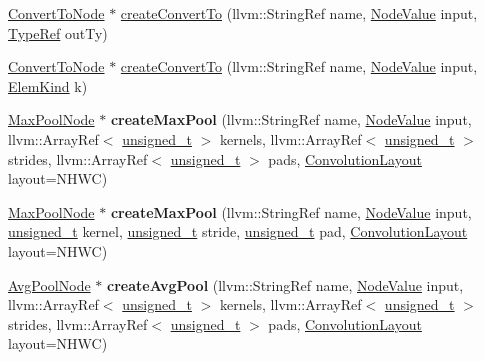 \begin{DoxyCompactItemize}
\item 
\hyperlink{classglow_1_1_convert_to_node}{Convert\+To\+Node} $\ast$ \hyperlink{classglow_1_1_function_afb186d99df71f01dc37871b7a91fe207}{create\+Convert\+To} (llvm\+::\+String\+Ref name, \hyperlink{structglow_1_1_node_value}{Node\+Value} input, \hyperlink{structglow_1_1_type}{Type\+Ref} out\+Ty)
\item 
\hyperlink{classglow_1_1_convert_to_node}{Convert\+To\+Node} $\ast$ \hyperlink{classglow_1_1_function_aad00b9f260eb7c5c21f5c59ebd0089b3}{create\+Convert\+To} (llvm\+::\+String\+Ref name, \hyperlink{structglow_1_1_node_value}{Node\+Value} input, \hyperlink{namespaceglow_ab92e14a94329daf4083db670e95fbcdf}{Elem\+Kind} k)
\item 
\mbox{\label{classglow_1_1_function_a81424770e89904f98f677caf5d494997}} 
\hyperlink{classglow_1_1_max_pool_node}{Max\+Pool\+Node} $\ast$ {\bfseries create\+Max\+Pool} (llvm\+::\+String\+Ref name, \hyperlink{structglow_1_1_node_value}{Node\+Value} input, llvm\+::\+Array\+Ref$<$ \hyperlink{namespaceglow_a0ca574644e1e42ef193a9947fb4d8911}{unsigned\+\_\+t} $>$ kernels, llvm\+::\+Array\+Ref$<$ \hyperlink{namespaceglow_a0ca574644e1e42ef193a9947fb4d8911}{unsigned\+\_\+t} $>$ strides, llvm\+::\+Array\+Ref$<$ \hyperlink{namespaceglow_a0ca574644e1e42ef193a9947fb4d8911}{unsigned\+\_\+t} $>$ pads, \hyperlink{namespaceglow_aa2f3a33e05699df0f42295c5c4bd1f77}{Convolution\+Layout} layout=N\+H\+WC)
\item 
\mbox{\label{classglow_1_1_function_a3494f53b040eec329effdeca0373a19d}} 
\hyperlink{classglow_1_1_max_pool_node}{Max\+Pool\+Node} $\ast$ {\bfseries create\+Max\+Pool} (llvm\+::\+String\+Ref name, \hyperlink{structglow_1_1_node_value}{Node\+Value} input, \hyperlink{namespaceglow_a0ca574644e1e42ef193a9947fb4d8911}{unsigned\+\_\+t} kernel, \hyperlink{namespaceglow_a0ca574644e1e42ef193a9947fb4d8911}{unsigned\+\_\+t} stride, \hyperlink{namespaceglow_a0ca574644e1e42ef193a9947fb4d8911}{unsigned\+\_\+t} pad, \hyperlink{namespaceglow_aa2f3a33e05699df0f42295c5c4bd1f77}{Convolution\+Layout} layout=N\+H\+WC)
\item 
\mbox{\label{classglow_1_1_function_a34cfd29adbc1ac732b8e54729cc9fc15}} 
\hyperlink{classglow_1_1_avg_pool_node}{Avg\+Pool\+Node} $\ast$ {\bfseries create\+Avg\+Pool} (llvm\+::\+String\+Ref name, \hyperlink{structglow_1_1_node_value}{Node\+Value} input, llvm\+::\+Array\+Ref$<$ \hyperlink{namespaceglow_a0ca574644e1e42ef193a9947fb4d8911}{unsigned\+\_\+t} $>$ kernels, llvm\+::\+Array\+Ref$<$ \hyperlink{namespaceglow_a0ca574644e1e42ef193a9947fb4d8911}{unsigned\+\_\+t} $>$ strides, llvm\+::\+Array\+Ref$<$ \hyperlink{namespaceglow_a0ca574644e1e42ef193a9947fb4d8911}{unsigned\+\_\+t} $>$ pads, \hyperlink{namespaceglow_aa2f3a33e05699df0f42295c5c4bd1f77}{Convolution\+Layout} layout=N\+H\+WC)

\end{DoxyCompactItemize}
